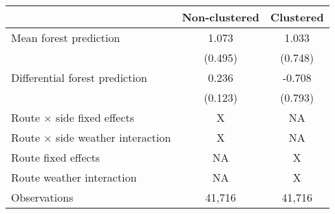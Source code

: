 \begingroup
\setlength{}
\setlength{}\fontsize{9.0pt}{10.8pt}\selectfont
\begin{longtable}{@{\extracolsep{\fill}}lcc}
\toprule
  & Non-clustered & Clustered \\ 
\midrule\addlinespace[2.5pt]
Mean forest prediction & 1.073 & 1.033 \\ 
 & (0.495) & (0.748) \\ 
Differential forest prediction & 0.236 & -0.708 \\ 
{} & {(0.123)} & {(0.793)} \\ 
Route × side fixed effects & X & NA \\ 
Route × side weather interaction & X & NA \\ 
Route fixed effects & NA & X \\ 
Route weather interaction & NA & X \\ 
Observations & 41,716 & 41,716 \\ 
\bottomrule
\end{longtable}
\endgroup

